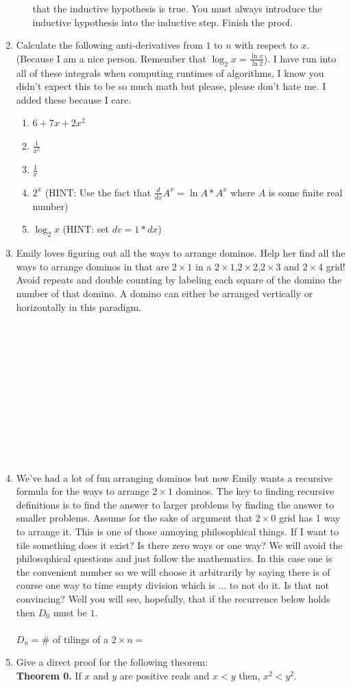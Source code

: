 \documentclass[12pt]{article}
\begin{document}
\begin{enumerate}
\begin{enumerate}
that the inductive hypothesis is true. You must always introduce the inductive hypothesis into 
the inductive step. Finish the proof.
\end{enumerate}
\newpage
\item Calculate the following anti-derivatives from $1$ to $n$ with respect to $x$. 
(Because I am a nice person. Remember that $\log_2{x}=\frac{\ln{x}}{\ln{2}}$). 
I have run into all of these integrals when computing runtimes of algorithms, 
I know you didn't expect this to be so much math but please, please don't hate me. 
I added these because I care.
\begin{enumerate}
\item $6+7x+2x^2$
\item $\frac{1}{x^2}$
\item $\frac{1}{x}$
\item $2^x$ (HINT: Use the fact that $\frac{d}{dx}A^x = \ln{A}*A^x$ where $A$ is some finite real number)
\item $\log_{2}{x}$  (HINT: set $dv=1*dx$)
\end{enumerate}
\newpage
\item Emily loves figuring out all the ways to arrange dominos. Help her find all the ways to arrange dominos in that are 
$2 \times 1$ in a $2 \times 1$,$2 \times 2$,$2 \times 3$ and $2 \times 4$ grid! Avoid repeats and 
double counting by labeling each square of the domino the number of that domino. A domino can either be 
arranged vertically or horizontally in this paradigm.\\\\\\\\\\\\\\\\\\\\\\\\
\item We've had a lot of fun arranging dominos but now Emily wants a recursive formula for the ways to arrange 
$2 \times 1$ dominos. The key to finding recursive definitions is to find the answer to larger problems by finding 
the answer to smaller problems. Assume for the sake of argument that $2 \times 0$ grid has 1 way to arrange it. This 
is one of those annoying philosophical things. If I want to tile something does it exist? Is there 
zero ways or one way? We will avoid the philosophical questions and just follow the mathematics. In this case 
one is the convenient number so we will choose it arbitrarily by saying there is of course 
one way to time empty division which is $\dots$ to not do it. Is that not convincing? Well you will see, 
hopefully, that if the recurrence below holds then $D_0$ must be $1$.\\\\
$D_n = $\# of tilings of a $2 \times n =$
\newpage
\item Give a direct proof for the following theorem:
\\ \textbf{Theorem 0.} If $x$ and $y$ are positive reals and $x < y$ then, $x^2 < y^2$.
\end{enumerate}
\end{document}
